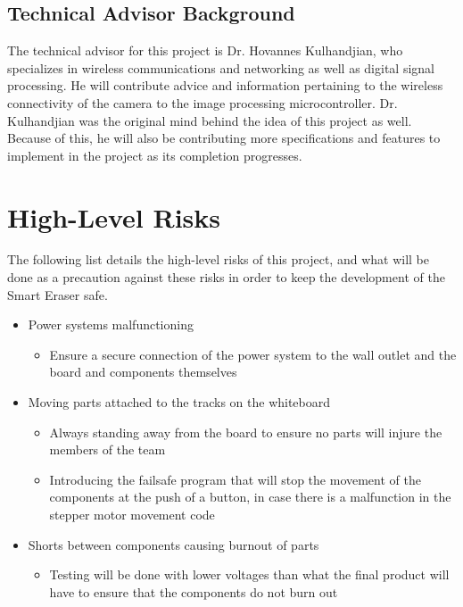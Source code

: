 \subsection{Technical Advisor Background} \par	
\setlength{\parindent}{2.5ex} The technical advisor for this project is Dr. Hovannes Kulhandjian, who specializes in wireless communications and networking as well as digital signal processing. He will contribute advice and information pertaining to the wireless connectivity of the camera to the image processing microcontroller. Dr. Kulhandjian was the original mind behind the idea of this project as well. Because of this, he will also be contributing more specifications and features to implement in the project as its completion progresses. \\ \par

\section{High-Level Risks}
The following list details the high-level risks of this project, and what will be done as a precaution against these risks in order to keep the development of the Smart Eraser safe.
\begin{itemize}
	\item Power systems malfunctioning
	\begin{itemize}
	\item Ensure a secure connection of the power system to the wall outlet and the board and components themselves
	\end{itemize}
	\item Moving parts attached to the tracks on the whiteboard
	\begin{itemize}
	\item Always standing away from the board to ensure no parts will injure the members of the team
	\item Introducing the failsafe program that will stop the movement of the components at the push of a button, in case there is a malfunction in the stepper motor movement code
	\end{itemize}
	\item Shorts between components causing burnout of parts
	\begin{itemize}
	\item Testing will be done with lower voltages than what the final product will have to ensure that the components do not burn out
\end{itemize}
\end{itemize}

